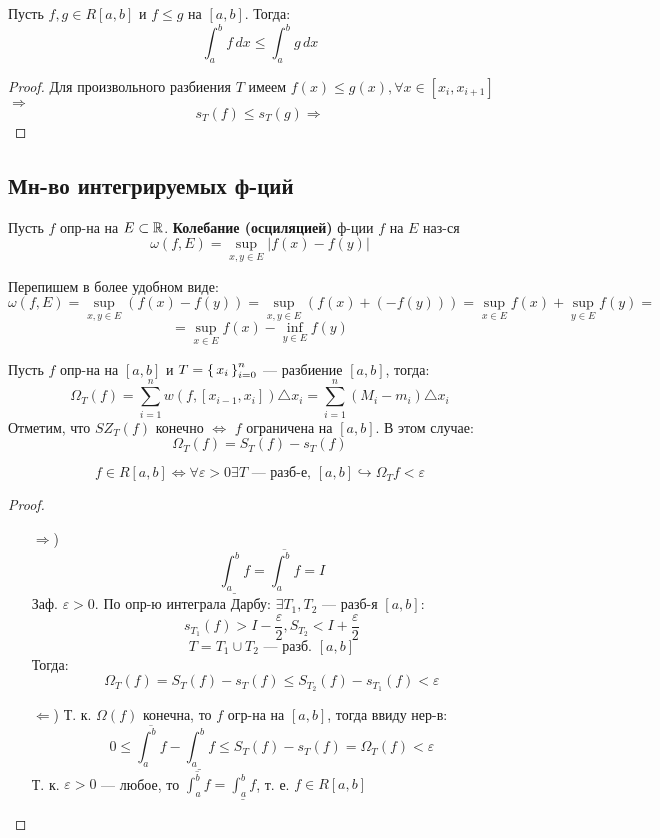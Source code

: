 \begin{consequence}
  \label{cs:riemann_feature_3}
  Пусть $f, g \in R[a, b]$ и $f \leq g$ на $[a, b]$. Тогда:
  \[
  \int_{a}^{b} f \, dx \leq \int_{a}^{b} g \, dx
  \]
\end{consequence}
\begin{proof}
Для произвольного разбиения $T$ имеем $f(x) \leq g(x), \forall x \in [x_{i}, x_{i + 1}]$ $\Rightarrow$
\[
s_{T}(f) \leq s_{T}(g) \Rightarrow
\]
\end{proof}
\subsection{Мн-во интегрируемых ф-ций}
\begin{definition}
Пусть $f$ опр-на на $E \subset \mathbb{R}$. \textbf{Колебание (осциляцией)} ф-ции $f$ на $E$ наз-ся
\[
  \omega(f, E) = \underset{x, y \in E}{\sup} \left|f(x) - f(y)\right|
\]
\end{definition}
\begin{note}
Перепишем в более удобном виде:
\[
  \omega(f, E) = \underset{x, y \in E}{\sup} (f(x) - f(y)) = \underset{x, y \in E}{\sup} (f(x) + (-f(y))) = \underset{x \in E}{\sup} f(x) + \underset{y \in E}{\sup} f(y) =
\]
\[
 = \underset{x \in E}{\sup} f(x) - \underset{y \in E}{\inf} f(y)
\]
\end{note}
Пусть $f$ опр-на на $[a, b]$ и $T = \set{x_i}_{i = 0}^{n}$ --- разбиение $[a, b]$, тогда:
\[
\Omega_T(f) = \sum_{i = 1}^{n} w(f, [x_{i - 1}, x_i])\triangle x_i = \sum_{i = 1}^{n} (M_i - m_i) \triangle x_i
\]
Отметим, что $SZ_T(f)$ конечно $\iff$ $f$ ограничена на $[a, b]$. В этом случае:
\[
\Omega_T(f) = S_T(f) - s_T(f)
\]
\begin{theorem}
\label{th:3}
\[
  f \in R[a, b] \iff \forall \varepsilon > 0 \exists T \text{ --- разб-е, } [a, b] \hookrightarrow \Omega_T{f} < \varepsilon
\]
\end{theorem}
\begin{proof}
\begin{itemize}
  \item [$\Rightarrow$)]
    \[
    \underline{\int_{a}^{b} f} = \overline{\int_{a}^{b} f} = I
    \]
    Заф. $\varepsilon > 0$. По опр-ю интеграла Дарбу: $\exists T_1, T_2$ --- разб-я $[a, b]$:
    \[
    s_{T_1}(f) > I - \frac{\varepsilon}{2}, S_{T_2} < I + \frac{\varepsilon}{2}
    \]
    \[
    T = T_1 \cup T_2 \text{ --- разб. $[a, b]$}
    \]
    Тогда:
    \[
    \Omega_T(f) = S_T(f) - s_T(f) \leq S_{T_2}(f) - s_{T_1}(f) < \varepsilon
    \]
  \item [$\Leftarrow$)] Т. к. $\Omega(f)$ конечна, то $f$ огр-на на $[a, b]$, тогда ввиду нер-в:
    \[
    0 \leq \overline{\int_{a}^{b} f} - \underline{\int_{a}^{b} f} \leq S_T(f) - s_T(f) = \Omega_T(f) < \varepsilon
    \]
    Т. к. $\varepsilon > 0$ --- любое, то $\overline{\int_{a}^{b} f} = \underline{\int_{a}^{b} f}$, т. е. $f \in R[a, b]$
\end{itemize}
\end{proof}
